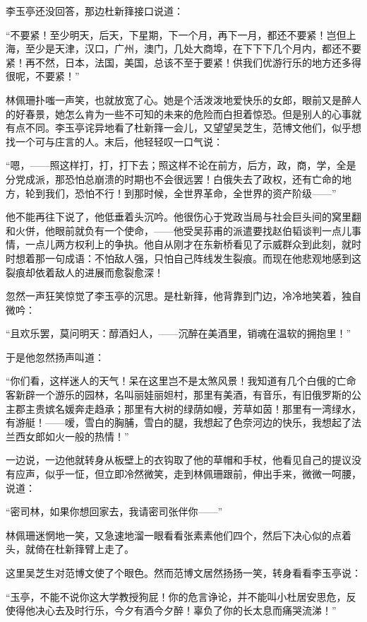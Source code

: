 \par 李玉亭还没回答，那边杜新箨接口说道：
\par “不要紧！至少明天，后天，下星期，下一个月，再下一月，都还不要紧！岂但上海，至少是天津，汉口，广州，澳门，几处大商埠，在下下下几个月内，都还不要紧！再不然，日本，法国，美国，总该不至于要紧！供我们优游行乐的地方还多得很呢，不要紧！”
\par 林佩珊扑嗤一声笑，也就放宽了心。她是个活泼泼地爱快乐的女郎，眼前又是醉人的好春景，她怎么肯为一些不可知的未来的危险而白担着惊恐。但是别人的心事就有点不同。李玉亭诧异地看了杜新箨一会儿，又望望吴芝生，范博文他们，似乎想找一个可与庄言的人。末后，他轻轻叹一口气说：
\par “嗯，——照这样打，打，打下去；照这样不论在前方，后方，政，商，学，全是分党成派，那恐怕总崩溃的时期也不会很远罢！白俄失去了政权，还有亡命的地方，轮到我们，恐怕不行！到那时候，全世界革命，全世界的资产阶级——”
\par 他不能再往下说了，他低垂着头沉吟。他很伤心于党政当局与社会巨头间的窝里翻和火併，他眼前就负有一个使命，——他受吴荪甫的派遣要找赵伯韬谈判一点儿事情，一点儿两方权利上的争执。他自从刚才在东新桥看见了示威群众到此刻，就时时想着那一句成语：不怕敌人强，只怕自己阵线发生裂痕。而现在他悲观地感到这裂痕却依着敌人的进展而愈裂愈深！
\par 忽然一声狂笑惊觉了李玉亭的沉思。是杜新箨，他背靠到门边，冷冷地笑着，独自微吟：
\par “且欢乐罢，莫问明天：醇酒妇人，——沉醉在美酒里，销魂在温软的拥抱里！”
\par 于是他忽然扬声叫道：
\par “你们看，这样迷人的天气！呆在这里岂不是太煞风景！我知道有几个白俄的亡命客新辟一个游乐的园林，名叫丽娃丽妲村，那里有美酒，有音乐，有旧俄罗斯的公主郡主贵嫔名媛奔走趋承；那里有大树的绿荫如幔，芳草如茵！那里有一湾绿水，有游艇！——嗳，雪白的胸脯，雪白的腿，我想起了色奈河边的快乐，我想起了法兰西女郎如火一般的热情！”
\par 一边说，一边他就转身从板壁上的衣钩取了他的草帽和手杖，他看见自己的提议没有应声，似乎一怔，但立即冷然微笑，走到林佩珊跟前，伸出手来，微微一呵腰，说道：
\par “密司林，如果你想回家去，我请密司张伴你——”
\par 林佩珊迷惘地一笑，又急速地溜一眼看看张素素他们四个，然后下决心似的点着头，就倚在杜新箨臂上走了。
\par 这里吴芝生对范博文使了个眼色。然而范博文居然扬扬一笑，转身看看李玉亭说：
\par “玉亭，不能不说你这大学教授狗屁！你的危言诤论，并不能叫小杜居安思危，反使得他决心去及时行乐，今夕有酒今夕醉！辜负了你的长太息而痛哭流涕！”
